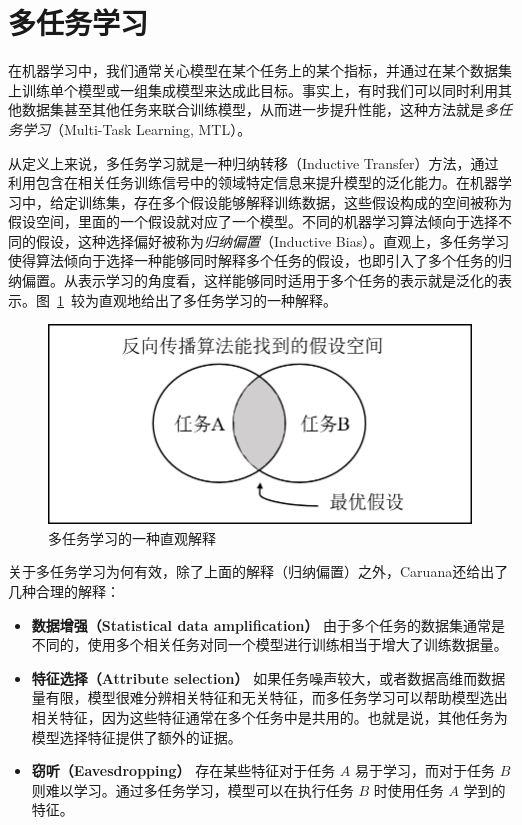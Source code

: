\section{多任务学习}
\label{sec:mtl}
在机器学习中，我们通常关心模型在某个任务上的某个指标，并通过在某个数据集上训练单个模型或一组集成模型来达成此目标。事实上，有时我们可以同时利用其他数据集甚至其他任务来联合训练模型，从而进一步提升性能，这种方法就是\emph{多任务学习}（Multi-Task Learning, MTL）。

从定义上来说，多任务学习就是一种归纳转移（Inductive Transfer）方法，通过利用包含在相关任务训练信号中的领域特定信息来提升模型的泛化能力\cite{Caruana1997}。在机器学习中，给定训练集，存在多个假设能够解释训练数据，这些假设构成的空间被称为假设空间，里面的一个假设就对应了一个模型。不同的机器学习算法倾向于选择不同的假设，这种选择偏好被称为\emph{归纳偏置}（Inductive Bias）。直观上，多任务学习使得算法倾向于选择一种能够同时解释多个任务的假设，也即引入了多个任务的归纳偏置。从表示学习的角度看，这样能够同时适用于多个任务的表示就是泛化的表示。图~\ref{fig:mtl_int}~较为直观地给出了多任务学习的一种解释。

\begin{figure}[htb]
	\centering
	\includegraphics[scale=0.55]{mtl_int.png}
	\caption{多任务学习的一种直观解释}
	\label{fig:mtl_int}
\end{figure}

关于多任务学习为何有效，除了上面的解释（归纳偏置）之外，Caruana还给出了几种合理的解释\cite{Caruana1997}：

\begin{itemize}
	\item \textbf{数据增强（Statistical data amplification）} 由于多个任务的数据集通常是不同的，使用多个相关任务对同一个模型进行训练相当于增大了训练数据量。
	\item \textbf{特征选择（Attribute selection）} 如果任务噪声较大，或者数据高维而数据量有限，模型很难分辨相关特征和无关特征，而多任务学习可以帮助模型选出相关特征，因为这些特征通常在多个任务中是共用的。也就是说，其他任务为模型选择特征提供了额外的证据。
	\item \textbf{窃听（Eavesdropping）} 存在某些特征对于任务 $A$ 易于学习，而对于任务 $B$ 则难以学习。通过多任务学习，模型可以在执行任务 $B$ 时使用任务 $A$ 学到的特征。
\end{itemize}


